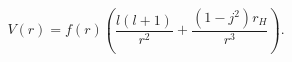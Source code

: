 \begin{equation} \label{schwarzschild-4d-potential-repeated}
V(r) = f(r) \left( \frac{l(l+1)}{r^2} + \frac{(1-j^2)r_H}{r^3} \right).
\end{equation}

